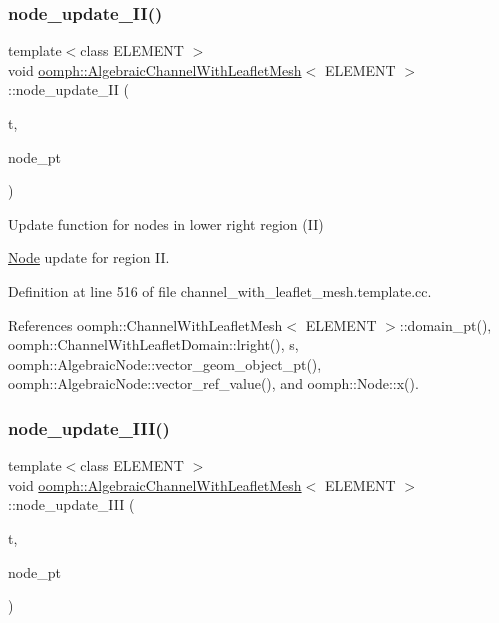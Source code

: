 \subsubsection{\texorpdfstring{node\+\_\+update\+\_\+\+I\+I()}{node\_update\_II()}}
{\footnotesize\ttfamily template$<$class E\+L\+E\+M\+E\+NT $>$ \\
void \hyperlink{classoomph_1_1AlgebraicChannelWithLeafletMesh}{oomph\+::\+Algebraic\+Channel\+With\+Leaflet\+Mesh}$<$ E\+L\+E\+M\+E\+NT $>$\+::node\+\_\+update\+\_\+\+II (\begin{DoxyParamCaption}\item[{const unsigned \&}]{t,  }\item[{\hyperlink{classoomph_1_1AlgebraicNode}{Algebraic\+Node} $\ast$\&}]{node\+\_\+pt }\end{DoxyParamCaption})\hspace{0.3cm}{\ttfamily [protected]}}



Update function for nodes in lower right region (II) 

\hyperlink{classoomph_1_1Node}{Node} update for region II. 

Definition at line 516 of file channel\+\_\+with\+\_\+leaflet\+\_\+mesh.\+template.\+cc.



References oomph\+::\+Channel\+With\+Leaflet\+Mesh$<$ E\+L\+E\+M\+E\+N\+T $>$\+::domain\+\_\+pt(), oomph\+::\+Channel\+With\+Leaflet\+Domain\+::lright(), s, oomph\+::\+Algebraic\+Node\+::vector\+\_\+geom\+\_\+object\+\_\+pt(), oomph\+::\+Algebraic\+Node\+::vector\+\_\+ref\+\_\+value(), and oomph\+::\+Node\+::x().

\mbox{\label{classoomph_1_1AlgebraicChannelWithLeafletMesh_a5aed6f41b197dc7aab1d5d86b1b7d6d5}} 
\subsubsection{\texorpdfstring{node\+\_\+update\+\_\+\+I\+I\+I()}{node\_update\_III()}}
{\footnotesize\ttfamily template$<$class E\+L\+E\+M\+E\+NT $>$ \\
void \hyperlink{classoomph_1_1AlgebraicChannelWithLeafletMesh}{oomph\+::\+Algebraic\+Channel\+With\+Leaflet\+Mesh}$<$ E\+L\+E\+M\+E\+NT $>$\+::node\+\_\+update\+\_\+\+I\+II (\begin{DoxyParamCaption}\item[{const unsigned \&}]{t,  }\item[{\hyperlink{classoomph_1_1AlgebraicNode}{Algebraic\+Node} $\ast$\&}]{node\+\_\+pt }\end{DoxyParamCaption})\hspace{0.3cm}{\ttfamily [protected]}}



